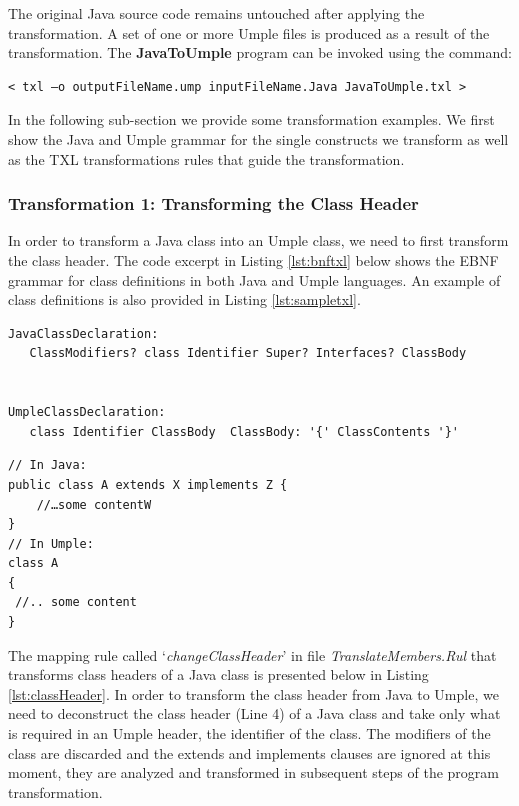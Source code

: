The original Java source code remains untouched after applying the transformation. A set of one or more Umple files is produced as a result of the transformation. The \textbf{JavaToUmple} program can be invoked using the command:

\vspace{\baselineskip}
\begin{lstlisting}[style=umplePlain]
< txl –o outputFileName.ump inputFileName.Java JavaToUmple.txl >
\end{lstlisting}

In the following sub-section we provide some transformation examples. We first show the Java and Umple grammar for the single constructs we transform as well as the TXL transformations rules that guide the transformation.

\subsubsection{Transformation 1: Transforming the Class Header} 

In order to transform a Java class into an Umple class, we need to first transform the class header. The code excerpt in Listing \ref{lst:bnftxl} below shows the EBNF grammar for class definitions in both Java and Umple languages. An example of class definitions is also provided in Listing \ref{lst:sampletxl}.

\begin{lstlisting}[style=umplePlain, caption="Class definition grammar in BNF form", label=lst:bnftxl]
JavaClassDeclaration: 
   ClassModifiers? class Identifier Super? Interfaces? ClassBody


UmpleClassDeclaration: 
   class Identifier ClassBody  ClassBody: '{' ClassContents '}'

\end{lstlisting}

\begin{lstlisting}[style=umplePlain, caption=Class definitions in Java and Umple, label=lst:sampletxl]
// In Java:
public class A extends X implements Z {
    //…some contentW
}
// In Umple:
class A 
{	
 //.. some content
}
\end{lstlisting}

The mapping rule called `\textit{changeClassHeader}' in file \textit{TranslateMembers.Rul} that transforms class headers of a Java class is presented below in Listing \ref{lst:classHeader}. In order to transform the class header from Java to Umple, we need to deconstruct the class header  (Line 4)  of a Java class and take only what is required in an Umple header, the identifier of the class. The modifiers of the class are discarded and the extends and implements clauses are ignored at this moment, they are analyzed and transformed in subsequent steps of the program transformation. 

